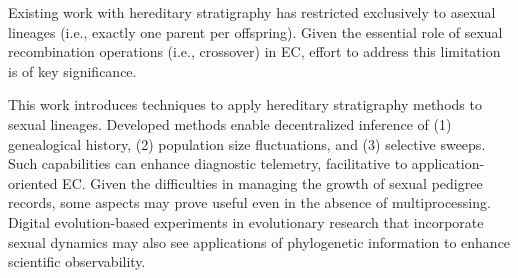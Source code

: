 Existing work with hereditary stratigraphy has restricted exclusively to asexual lineages (i.e., exactly one parent per offspring).
Given the essential role of sexual recombination operations (i.e., crossover) in EC, effort to address this limitation is of key significance.

This work introduces techniques to apply hereditary stratigraphy methods to sexual lineages.
Developed methods enable decentralized inference of (1) genealogical history, (2) population size fluctuations, and (3) selective sweeps.
Such capabilities can enhance diagnostic telemetry, facilitative to application-oriented EC.
Given the difficulties in managing the growth of sexual pedigree records, some aspects may prove useful even in the absence of multiprocessing.
Digital evolution-based experiments in evolutionary research that incorporate sexual dynamics may also see applications of phylogenetic information to enhance scientific observability.

